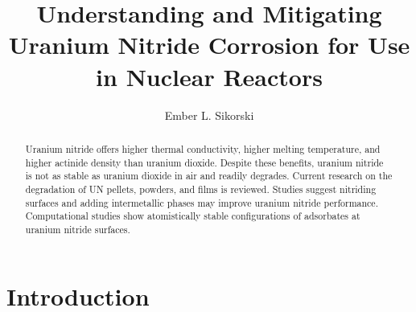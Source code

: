 \documentclass[3p,review,11pt]{elsarticle}
\begin{document}
\begin{frontmatter}
	\title{Understanding and Mitigating Uranium Nitride Corrosion for Use in Nuclear Reactors}
	
	\author{Ember L. Sikorski}
	
	
	
	\begin{abstract}
Uranium nitride offers higher thermal conductivity, higher melting temperature, and higher actinide density than uranium dioxide. Despite these benefits, uranium nitride is not as stable as uranium dioxide in air and readily degrades. Current research on the degradation of UN pellets, powders, and films is reviewed. Studies suggest nitriding surfaces and adding intermetallic phases may improve uranium nitride performance. Computational studies show atomistically stable configurations of adsorbates at uranium nitride surfaces.
	\end{abstract}	
	
\end{frontmatter}


\section{Introduction}
\end{document}
